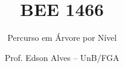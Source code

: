 \title{BEE 1466}
\subtitle{Percurso em Árvore por Nível}
\author{Prof. Edson Alves -- UnB/FGA}
\date{}
